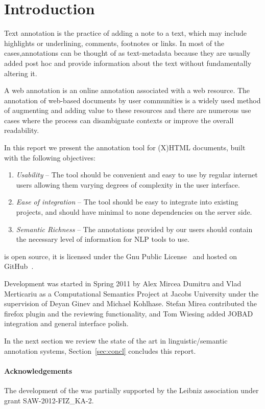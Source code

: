 \section{Introduction}\label{sec:intro}
Text annotation is the practice of adding a note to a text, which may include highlights
or underlining, comments, footnotes or links.  In most of the cases,annotations can be
thought of as text-metadata because they are usually added post hoc and provide
information about the text without fundamentally altering it.

A web annotation is an online annotation associated with a web resource. The annotation of
web-based documents by user communities is a widely used method of augmenting and adding
value to these resources and there are numerous use cases where the process can
disambiguate contexts or improve the overall readability.

In this report we present the \KAT annotation tool for (X)HTML documents, built with the
following objectives:
\begin{enumerate}
\item \emph{Usability} -- The tool should be convenient and easy to use by regular
  internet users allowing them varying degrees of complexity in the user interface.
\item \emph{Ease of integration} -- The tool should be easy to integrate into existing
  projects, and should have minimal to none dependencies on the server side.
\item \emph{Semantic Richness} -- The annotations provided by our users should contain the
  necessary level of information for NLP tools to use.
\end{enumerate}

\KAT is open source, it is licensed under the Gnu Public License~\cite{GPL:on} and hosted
on GitHub~\cite{KAT:github:on}. 

Development was started in Spring 2011 by Alex Mircea Dumitru and Vlad Merticariu as a
Computational Semantics Project at Jacobs University under the supervision of Deyan Ginev
and Michael Kohlhase. Stefan Mirea contributed the firefox plugin and the reviewing
functionality, and Tom Wiesing added JOBAD integration and general interface polish.

In the next section we review the state of the art in linguistic/semantic annotation
systems,  Section~\ref{sec:concl} concludes this report.

\paragraph{Acknowledgements}
The development of the \KAT was partially supported by the Leibniz association under grant
SAW-2012-FIZ\_KA-2.


